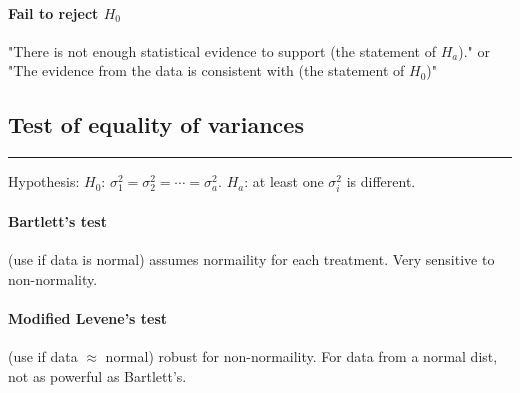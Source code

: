 \documentclass[10pt]{article}
\begin{document}
\paragraph{Fail to reject $H_0$} "There is not enough statistical evidence to support (the statement of $H_a$)."
or "The evidence from the data is consistent with (the statement of $H_0$)"

\subsection*{Test of equality of variances}
\hrule width 5cm
\vspace{6pt}
Hypothesis: $H_0$: $\sigma_1^2 = \sigma_2^2 = \cdots = \sigma_a^2$. $H_a$: at least one $\sigma_i^2$ is different.
\paragraph{Bartlett's test} (use if data is normal) assumes normaility for each treatment. Very sensitive to non-normality.
\paragraph{Modified Levene's test} (use if data $\approx$ normal) robust for non-normaility. For data from a normal dist, not as powerful as Bartlett's.

\end{document}
